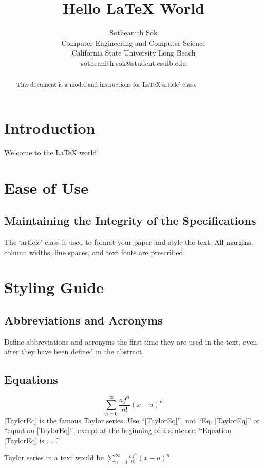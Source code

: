 \documentclass{article}
\begin{document}
\title{Hello \LaTeX\xspace World}

\author{Sotheanith Sok \\
\small{Computer Engineering and Computer Science}\\
\small{California State University Long Beach}\\
\small{\texttt{}{sotheanith.sok@student.csulb.edu}}
}
\date{}
\maketitle

\begin{abstract}
This document is a model and instructions for \LaTeX\xspace `article' class.
\end{abstract}

\section{Introduction}
Welcome to the \LaTeX\xspace world.

\section{Ease of Use}

\subsection{Maintaining the Integrity of the Specifications}
The `article' class is used to format your paper and style the text. All margins, column widths, line spaces, and text fonts are prescribed.

\section{Styling Guide}

\subsection{Abbreviations and Acronyms}
Define abbreviations and acronyms the first time they are used in the text, 
even after they have been defined in the abstract.

\subsection{Equations}
\begin{equation}
\label{TaylorEq}
\sum_{n=0}^{\infty}\frac{af^n}{n!}(x-a)^n
\end{equation}
\noindent\eqref{TaylorEq} is the famous Taylor series. Use ``\eqref{TaylorEq}'', not ``Eq. \eqref{TaylorEq}'' or ``equation \eqref{TaylorEq}'', except at the beginning of a sentence: ``Equation \eqref{TaylorEq} is . . .''\par
Taylor series in a text would be $\sum_{n=0}^{\infty}\frac{af^n}{n!}(x-a)^n$
\end{document}
